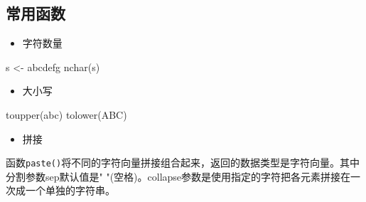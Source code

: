 \documentclass[
]{book}
\newenvironment{Shaded}{\begin{snugshade}}{\end{snugshade}}
\newcommand{\FunctionTok}[1]{\textcolor[rgb]{0.00,0.00,0.00}{#1}}
\newcommand{\NormalTok}[1]{#1}
\newcommand{\OtherTok}[1]{\textcolor[rgb]{0.56,0.35,0.01}{#1}}
\newcommand{\StringTok}[1]{\textcolor[rgb]{0.31,0.60,0.02}{#1}}
\providecommand{\tightlist}{%
  \setlength{\itemsep}{0pt}\setlength{\parskip}{0pt}}
\begin{document}
\hypertarget{ux5e38ux7528ux51fdux6570}{%
\subsection{常用函数}\label{ux5e38ux7528ux51fdux6570}}

\begin{itemize}
\tightlist
\item
  字符数量
\end{itemize}

\begin{Shaded}
\begin{Highlighting}[]
\NormalTok{s }\OtherTok{\textless{}{-}} \StringTok{\textquotesingle{}abcdefg\textquotesingle{}}
\FunctionTok{nchar}\NormalTok{(s)}
\end{Highlighting}
\end{Shaded}

\begin{itemize}
\tightlist
\item
  大小写
\end{itemize}

\begin{Shaded}
\begin{Highlighting}[]
\FunctionTok{toupper}\NormalTok{(}\StringTok{\textquotesingle{}abc\textquotesingle{}}\NormalTok{)}
\FunctionTok{tolower}\NormalTok{(}\StringTok{\textquotesingle{}ABC\textquotesingle{}}\NormalTok{)}
\end{Highlighting}
\end{Shaded}

\begin{itemize}
\tightlist
\item
  拼接
\end{itemize}

函数\texttt{paste()}将不同的字符向量拼接组合起来，返回的数据类型是字符向量。其中分割参数sep默认值是" "(空格)。collapse参数是使用指定的字符把各元素拼接在一次成一个单独的字符串。
\end{document}
